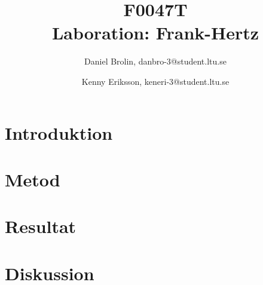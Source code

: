 ﻿\documentclass{article}
\title{F0047T\\Laboration: Frank-Hertz}
\author{Daniel Brolin, danbro-3@student.ltu.se \and Kenny Eriksson, keneri-3@student.ltu.se}
\numberwithin{equation}{section}
\begin{document}
\maketitle
\newpage

\begin{abstract}

\end{abstract}
\newpage
 


\setcounter{page}{1}

\section{Introduktion}

\newpage

\section{Metod}\label{sec:met}

\newpage

\section{Resultat}\label{sec:res}

\newpage

\section{Diskussion}



\end{document}
